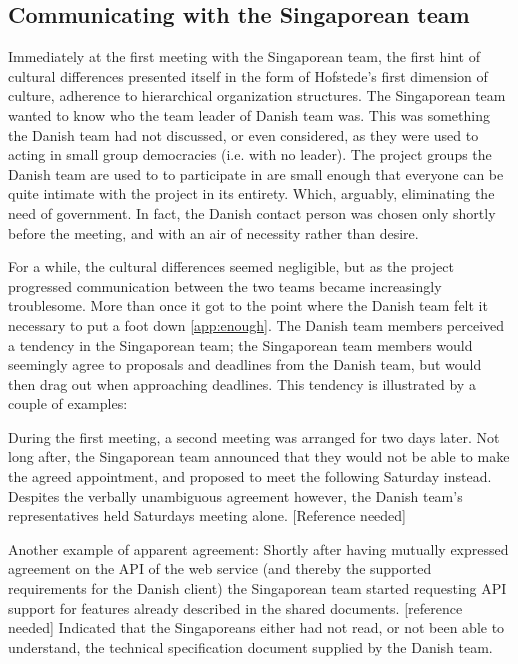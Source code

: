 \subsection{Communicating with the Singaporean team}
\label{sec:communicating}

Immediately at the first meeting with the Singaporean team, the first hint of
cultural differences presented itself in the form of Hofstede's first dimension
of culture, adherence to hierarchical organization structures\cite{surprises}.
The Singaporean team wanted to know who the team leader of Danish team was.
This was something the Danish team had not discussed, or even considered, as
they were used to acting in small group democracies (i.e. with no leader). The
project groups the Danish team are used to to participate in are small enough
that everyone can be quite intimate with the project in its entirety. Which,
arguably, eliminating the need of government. In fact, the Danish contact
person was chosen only shortly before the meeting, and with an air of necessity
rather than desire.

For a while, the cultural differences seemed negligible, but as the project
progressed communication between the two teams became increasingly troublesome.
More than once it got to the point where the Danish team felt it necessary to
put a foot down \ref{app:enough}. The Danish team members perceived a tendency
in the Singaporean team; the Singaporean team members would seemingly agree to
proposals and deadlines from the Danish team, but would then drag out when
approaching deadlines. This tendency is illustrated by a couple of examples:

During the first meeting, a second meeting was arranged for two days later. Not
long after, the Singaporean team announced that they would not be able to make
the agreed appointment, and proposed to meet the following Saturday instead.
Despites the verbally unambiguous agreement however, the Danish team's
representatives held Saturdays meeting alone. [Reference needed]

Another example of apparent agreement: Shortly after having mutually expressed
agreement on the API of the web service (and thereby the supported requirements
for the Danish client) the Singaporean team started requesting API support for
features already described in the shared documents. [reference needed]
Indicated that the Singaporeans either had not read, or not been able to
understand, the technical specification document supplied by the Danish team.

